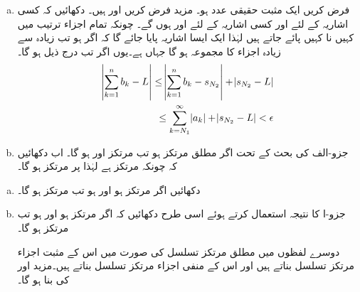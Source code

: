 \begin{enumerate}[a.]
\item
فرض کریں  ایک مثبت حقیقی عدد ہو۔ مزید فرض کریں  اور  ہیں۔  دکھائیں کہ کسی اشاریہ  کے لئے اور کسی اشاریہ  کے لئے 
 اور  ہوں گے۔ چونکہ تمام اجزاء   ترتیب  میں کہیں نا کہیں پائے جاتے ہیں لہٰذا ایک ایسا اشاریہ  پایا جائے گا کہ اگر  ہو تب  زیادہ سے زیادہ اجزاء  کا مجموعہ ہو گا جہاں  ہے۔یوں اگر   تب  درج ذیل ہو گا۔
\begin{align*}
\abs{\sum_{k=1}^{n}b_k-L}\le \abs{\sum_{k=1}^{n}b_k-s_{N_2}}+\abs{s_{N_2}-L}\\
\le \sum_{k=N_1}^{\infty}\abs{a_k}+\abs{s_{N_2}-L}<\epsilon
\end{align*}
\item
جزو-الف کی بحث کے تحت اگر  مطلق مرتکز ہو تب  مرتکز اور
  ہو گا۔ اب دکھائیں کہ چونکہ  مرتکز ہے لہٰذا  پر  مرتکز ہو گا۔
\end{enumerate}
\begin{enumerate}[a.]
\item
دکھائیں اگر  مرتکز ہو اور  ہو تب  مرتکز ہو گا۔
\item
جزو-ا کا نتیجہ استعمال کرتے ہوئے اسی طرح دکھائیں کہ اگر  مرتکز ہو اور
  ہو تب   مرتکز ہو گا۔

دوسرے لفظوں میں مطلق مرتکز تسلسل کی صورت میں اس کے مثبت اجزاء مرتکز تسلسل بناتے ہیں اور اس کے منفی اجزاء مرتکز تسلسل بناتے ہیں۔مزید  اور  کی بنا
  ہو گا۔
\end{enumerate}
